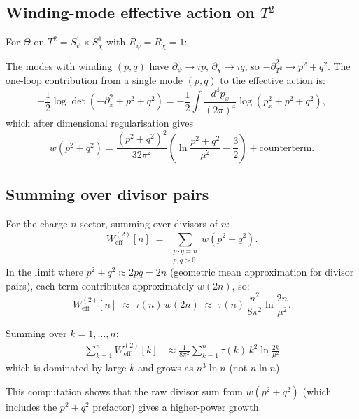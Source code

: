 \documentclass[12pt,a4paper]{article}
\theoremstyle{remark}
\begin{document}
\subsection{Winding-mode effective action on $T^2$}

For $\Theta$ on $T^2 = S^1_\psi\times S^1_\chi$ with $R_\psi = R_\chi = 1$:

The modes with winding $(p,q)$ have $\partial_\psi \to ip$,
$\partial_\chi \to iq$, so $-\partial^2_{T^2} \to p^2 + q^2$.
The one-loop contribution from a single mode $(p,q)$ to the effective action is:
\begin{equation}
  -\frac{1}{2}\log\det(-\partial^2_{x} + p^2 + q^2)
  = -\frac{1}{2}\int\frac{d^4p_x}{(2\pi)^4}\log(p_x^2 + p^2 + q^2),
  \label{eq:single_mode}
\end{equation}
which after dimensional regularisation gives
\begin{equation}
  w(p^2+q^2) = \frac{(p^2+q^2)^2}{32\pi^2}
  \left(\ln\frac{p^2+q^2}{\mu^2} - \frac{3}{2}\right) + \text{counterterm}.
  \label{eq:w}
\end{equation}

\subsection{Summing over divisor pairs}

For the charge-$n$ sector, summing over divisors of $n$:
\begin{equation}
  W_{\mathrm{eff}}^{(2)}[n]
  \;=\; \sum_{\substack{p\cdot q = n \\ p,q > 0}} w(p^2+q^2).
  \label{eq:W2}
\end{equation}
In the limit where $p^2+q^2 \approx 2pq = 2n$ (geometric mean approximation
for divisor pairs), each term contributes approximately $w(2n)$, so:
\begin{equation}
  W_{\mathrm{eff}}^{(2)}[n]
  \;\approx\; \tau(n)\,w(2n)
  \;\approx\; \tau(n)\,\frac{n^2}{8\pi^2}\ln\frac{2n}{\mu^2}.
  \label{eq:W2_approx}
\end{equation}

Summing over $k = 1,\ldots,n$:
\begin{align}
  \sum_{k=1}^{n} W_{\mathrm{eff}}^{(2)}[k]
  &\approx \frac{1}{8\pi^2}\sum_{k=1}^{n} \tau(k)\,k^2\ln\frac{2k}{\mu^2}
  \label{eq:sum_W}
\end{align}
which is dominated by large $k$ and grows as $n^3\ln n$ (not $n\ln n$).

This computation shows that the raw divisor sum from $w(p^2+q^2)$
(which includes the $p^2+q^2$ prefactor) gives a higher-power growth.
\end{document}
